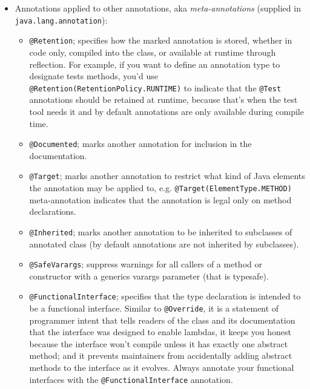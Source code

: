 \documentclass[8pt, table, xcdraw]{article}%
\begin{document}
\begin{itemize}
    \item Annotations applied to other annotations, aka \emph{meta-annotations} (supplied in \lstinline{java.lang.annotation}):
    \begin{itemize}
        \item \lstinline{@Retention}; specifies how the marked annotation is stored, whether in code only, compiled into the class, or available at runtime through reflection. For example, if you want to define an annotation type to designate tests methods, you'd use \lstinline{@Retention(RetentionPolicy.RUNTIME)} to indicate that the \lstinline{@Test} annotations should be retained at runtime, because that's when the test tool needs it and by default annotations are only available during compile time.
        \item \lstinline{@Documented}; marks another annotation for inclusion in the documentation.
        \item \lstinline{@Target}; marks another annotation to restrict what kind of Java elements the annotation may be applied to, e.g. \lstinline{@Target(ElementType.METHOD)} meta-annotation indicates that the annotation is legal only on method declarations.
        \item \lstinline{@Inherited}; marks another annotation to be inherited to subclasses of annotated class (by default annotations are not inherited by subclasses).
        \item \lstinline{@SafeVarargs}; suppress warnings for all callers of a method or constructor with a generics varargs parameter (that is typesafe).
        \item \lstinline{@FunctionalInterface}; specifies that the type declaration is intended to be a functional interface. Similar to \lstinline{@Override}, it is a statement of programmer intent that tells readers of the class and its documentation that the interface was designed to enable lambdas, it keeps you honest because the interface won't compile unless it has exactly one abstract method; and it prevents maintainers from accidentally adding abstract methods to the interface as it evolves. Always annotate your functional interfaces with the \lstinline{@FunctionalInterface} annotation.

\end{itemize}
\end{itemize}
\end{document}
